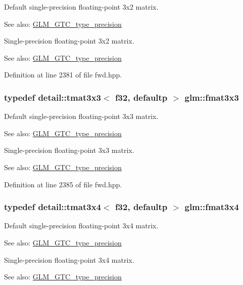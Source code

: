 Default single-precision floating-point 3x2 matrix. \begin{Desc}
\item[See also:]\hyperlink{group__gtc__type__precision}{GLM\_\-GTC\_\-type\_\-precision}\end{Desc}
Single-precision floating-point 3x2 matrix. \begin{Desc}
\item[See also:]\hyperlink{group__gtc__type__precision}{GLM\_\-GTC\_\-type\_\-precision} \end{Desc}


Definition at line 2381 of file fwd.hpp.\hypertarget{group__gtc__type__precision_gfa6841eaaa5ee45de1d892c26b349571}{
\subsubsection[fmat3x3]{\setlength{\rightskip}{0pt plus 5cm}typedef detail::tmat3x3$<$ f32, defaultp $>$ {\bf glm::fmat3x3}}}
\label{group__gtc__type__precision_gfa6841eaaa5ee45de1d892c26b349571}


Default single-precision floating-point 3x3 matrix. \begin{Desc}
\item[See also:]\hyperlink{group__gtc__type__precision}{GLM\_\-GTC\_\-type\_\-precision}\end{Desc}
Single-precision floating-point 3x3 matrix. \begin{Desc}
\item[See also:]\hyperlink{group__gtc__type__precision}{GLM\_\-GTC\_\-type\_\-precision} \end{Desc}


Definition at line 2385 of file fwd.hpp.\hypertarget{group__gtc__type__precision_g87084a1f4d6e8dd94f719029840dbafc}{
\subsubsection[fmat3x4]{\setlength{\rightskip}{0pt plus 5cm}typedef detail::tmat3x4$<$ f32, defaultp $>$ {\bf glm::fmat3x4}}}
\label{group__gtc__type__precision_g87084a1f4d6e8dd94f719029840dbafc}


Default single-precision floating-point 3x4 matrix. \begin{Desc}
\item[See also:]\hyperlink{group__gtc__type__precision}{GLM\_\-GTC\_\-type\_\-precision}\end{Desc}
Single-precision floating-point 3x4 matrix. \begin{Desc}
\item[See also:]\hyperlink{group__gtc__type__precision}{GLM\_\-GTC\_\-type\_\-precision} \end{Desc}


